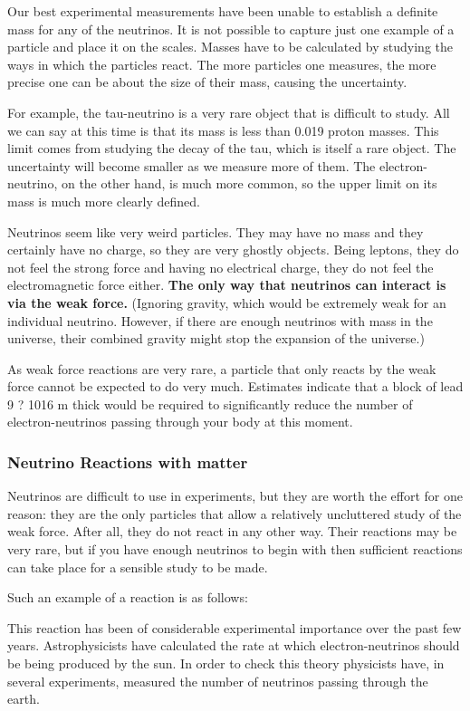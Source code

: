 Our best experimental measurements have been unable to establish a definite mass for any of the neutrinos. It is not possible to capture just one example of a particle and place it on the scales. Masses have to be calculated by studying the ways in which the particles react. The more particles one measures, the more precise one can be about the size of their mass, causing the uncertainty.

For example, the tau-neutrino is a very rare object that is difficult to study. All we can say at this time is that its mass is less than 0.019 proton masses. This limit comes from studying the decay of the tau, which is itself a rare object. The uncertainty will become smaller as we measure more of them. The electron-neutrino, on the other hand, is much more common, so the upper limit on its mass is much more clearly defined.

Neutrinos seem like very weird particles. They may have no mass and they certainly have no charge, so they are very ghostly objects. Being leptons, they do not feel the strong force and having no electrical charge, they do not feel the electromagnetic force either. \textbf{The only way that neutrinos can interact is via the weak force.} (Ignoring gravity, which would be extremely weak for an individual neutrino. However, if there are enough neutrinos with mass in the universe, their combined gravity might stop the expansion of the universe.)

As weak force reactions are very rare, a particle that only reacts by the weak force cannot be expected to do very much. Estimates indicate that a block of lead 9 ? 1016 m thick would be required to significantly reduce the number of electron-neutrinos passing through your body at this moment.

\subsubsection{Neutrino Reactions with matter}
Neutrinos are difficult to use in experiments, but they are worth the effort for one reason: they are the only particles that allow a relatively uncluttered study of the weak force. After all, they do not react in any other way. Their reactions may be very rare, but if you have enough neutrinos to begin with then sufficient reactions can take place for a sensible study to be made.

Such an example of a reaction is as follows:

This reaction has been of considerable experimental importance over the past few years. Astrophysicists have calculated the rate at which electron-neutrinos should be being produced by the sun. In order to check this theory physicists have, in several experiments, measured the number of neutrinos passing through the earth.

